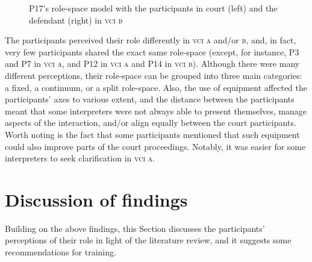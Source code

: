 \documentclass[output=paper]{langsci/langscibook}
\begin{document}
\begin{figure}
   
\caption{\label{fig:devaux:15}P17's role-space model with the participants in court (left) and the defendant (right) in \textsc{vci b}}
\end{figure}

The participants perceived their role differently in \textsc{vci a} and/or \textsc{b}, and, in fact, very few participants shared the exact same role-space (except, for instance, P3 and P7 in \textsc{vci a}, and P12 in \textsc{vci a} and P14 in \textsc{vci b}). Although there were many different perceptions, their role-space can be grouped into three main categories: a fixed, a continuum, or a split role-space. Also, the use of equipment affected the participants’ axes to various extent, and the distance between the participants meant that some interpreters were not always able to present themselves, manage aspects of the interaction, and/or align equally between the court participants. Worth noting is the fact that some participants mentioned that such equipment could also improve parts of the court proceedings. Notably, it was easier for some interpreters to seek clarification in \textsc{vci a}. 

\section{Discussion of findings}
\label{sec:devaux:6}
Building on the above findings, this Section discusses the participants’ perceptions of their role in light of the literature review, and it suggests some recommendations for training.
\end{document}
